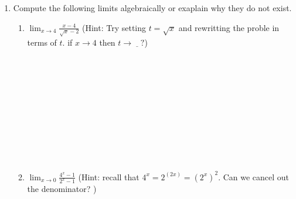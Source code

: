 \documentclass[12pt]{report}
\begin{document}
\begin{enumerate}[resume]
\item Compute the following limits algebraically or exaplain why they do not exist.\\
\begin{enumerate}[label=\alph*.]
    \item $\displaystyle{\lim_{x\to 4}\frac{x-4}{\sqrt{x}-2}}$ (Hint: Try setting $t=\sqrt{x}$ and rewritting the proble in terms of $t$. if $x\to 4$ then  $t\to \underline{\;\;\;}?$)\\\\\\\\\\\\\\\\\\\\\\
    \item $\displaystyle{\lim_{x\to 0}\frac{4^x-1}{2^x-1}}$ (Hint: recall that $4^x=2^{(2x)}=(2^{x})^2$. Can we cancel out the denominator? )


    
\end{enumerate}


\end{enumerate}
\end{document}

